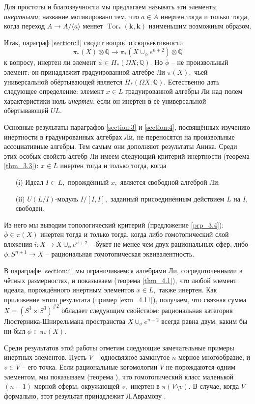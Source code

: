 \documentclass[10pt,a4paper]{article}
\DeclareMathOperator{\Tor}{Tor}
\def\QQ{\mathbb{Q}}
\def\k{\mathbf{k}}
\def\OX{{\Omega X}}
\theoremstyle{definition}
\begin{document}
Для простоты и благозвучности мы предлагаем называть эти элементы \emph{инертными}; название мотивировано тем, что $a\in A$ инертен тогда и только тогда, когда переход $A\to A/\langle a\rangle$ меняет $\Tor_*(\k,\k)$ наименьшим возможным образом.

Итак, параграф \ref{section:1} сводит вопрос о сюръективности $$\pi_*(X)\otimes\QQ\to \pi_*(X\cup_\phi e^{n+2})\otimes\QQ$$ к вопросу, инертен ли элемент $\overline{\phi}\in H_*(\OX;\QQ).$ Но $\overline{\phi}$ -- не произвольный элемент: он принадлежит градуированной алгебре Ли $\pi(X),$ чьей универсальной обёртывающей является $H_*(\OX;\QQ).$ Естественно дать следующее определение: элемент $x\in L$ градуированной алгебры Ли над полем характеристики ноль \emph{инертен}, если он инертен в её универсальной обёртывающей $UL.$

Основные результаты параграфов \ref{section:3} и \ref{section:4}, посвящённых изучению инертности в градуированных алгебрах Ли, не переносятся на произвольные ассоциативные алгебры. Тем самым они дополняют результаты Аника. Среди этих особых свойств алгебр Ли имеем следующий критерий инертности (теорема \ref{thm_3.3}): $x\in L$ инертен тогда и только тогда, когда
\begin{enumerate}
\item[(i)] Идеал $I\subset L,$ порождённый $x,$ является свободной алгеброй Ли;
\item[(ii)] $U(L/I)$-модуль $I/[I,I],$ заданный присоединённым действием $L$ на $I,$ свободен.
\end{enumerate} 
Из него мы выводим топологический критерий (предложение \ref{prp_3.4}): $\overline{\phi}\in\pi(X)$ инертен тогда и только тогда, когда либо гомотопический слой вложения $i:X\to X\cup_\phi e^{n+2}$ -- букет не менее чем двух рациональных сфер, либо $\phi:S^{n+1}\to X$ -- рациональная гомотопическая эквивалентность.

В параграфе \ref{section:4} мы ограничиваемся алгебрами Ли, сосредоточенными в чётных размерностях, и показываем (теорема \ref{thm_4.1}), что любой элемент идеала, порождённого инертным элементов $x\in L,$ также инертен. Как приложение этого результата (пример \ref{exm_4.11}), получаем, что связная сумма $X=(S^3\times S^3)^{\# 2}$ обладает следующим свойством: рациональная категория Люстерника-Шнирельмана пространства $X\cup_\phi e^{n+2}$ всегда равна двум, каким бы ни был $\phi\in \pi_*(X).$

Среди результатов этой работы отметим следующие замечательные примеры инертных элементов. Пусть $V$ -- односвязное замкнутое $n$-мерное многообразие, и $v\in V$ -- его точка. Если рациональные когомологии $V$ не порождаются одним элементом, мы показываем (теорема \cite{thm_5.1}), что гомотопический класс маленькой $(n-1)$-мерной сферы, окружающей $v,$ инертен в $\pi(V\setminus v).$ В случае, когда $V$ формально, этот результат принадлежит Л.Аврамову \cite{3}.
\end{document}
